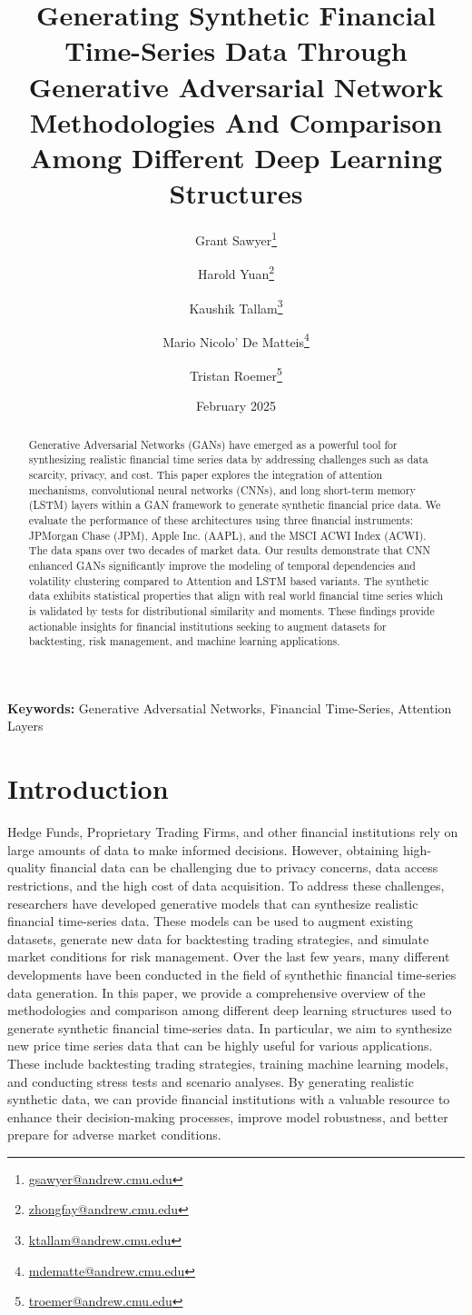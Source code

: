 \documentclass{article}
\title{Generating Synthetic Financial Time-Series Data Through Generative Adversarial Network\\[0.5em] \large Methodologies And Comparison Among Different Deep Learning Structures}
\author[1]{Grant Sawyer\thanks{\href{mailto:gsawyer@andrew.cmu.edu}{gsawyer@andrew.cmu.edu}}}
\author[1]{Harold Yuan\thanks{\href{mailto:zhongfay@andrew.cmu.edu}{zhongfay@andrew.cmu.edu}}}
\author[1]{Kaushik Tallam\thanks{\href{mailto:ktallam@andrew.cmu.edu}{ktallam@andrew.cmu.edu}}}
\author[1]{Mario Nicolo' De Matteis\thanks{\href{mailto:mdematte@andrew.cmu.edu}{mdematte@andrew.cmu.edu}}}
\author[1]{Tristan Roemer\thanks{\href{mailto:troemer@andrew.cmu.edu}{troemer@andrew.cmu.edu}}}
\affil[1]{Carnegie Mellon University, MSCF, New York, USA}
\date{February 2025}
\begin{document}
\maketitle

\begin{abstract}
    Generative Adversarial Networks (GANs) have emerged as a powerful tool for synthesizing realistic financial time series data by addressing challenges such as data scarcity, privacy, and cost. This paper explores the integration of attention mechanisms, convolutional neural networks (CNNs), and long short-term memory (LSTM) layers within a GAN framework to generate synthetic financial price data. We evaluate the performance of these architectures using three financial instruments: JPMorgan Chase (JPM), Apple Inc. (AAPL), and the MSCI ACWI Index (ACWI). The data spans over two decades of market data. Our results demonstrate that CNN enhanced GANs significantly improve the modeling of temporal dependencies and volatility clustering compared to Attention and LSTM based variants. The synthetic data exhibits statistical properties that align with real world financial time series which is validated by tests for distributional similarity and moments. These findings provide actionable insights for financial institutions seeking to augment datasets for backtesting, risk management, and machine learning applications.
\end{abstract}

\doublespacing

\noindent \textbf{Keywords:} Generative Adversatial Networks, Financial Time-Series, Attention Layers

\section{Introduction}

Hedge Funds, Proprietary Trading Firms, and other financial institutions rely on large amounts of data to make informed decisions. However, obtaining high-quality financial data can be challenging due to privacy concerns, data access restrictions, and the high cost of data acquisition. To address these challenges, researchers have developed generative models that can synthesize realistic financial time-series data. These models can be used to augment existing datasets, generate new data for backtesting trading strategies, and simulate market conditions for risk management. Over the last few years, many different developments have been conducted in the field of synthethic financial time-series data generation. In this paper, we provide a comprehensive overview of the methodologies and comparison among different deep learning structures used to generate synthetic financial time-series data. In particular, we aim to synthesize new price time series data that can be highly useful for various applications. These include backtesting trading strategies, training machine learning models, and conducting stress tests and scenario analyses. By generating realistic synthetic data, we can provide financial institutions with a valuable resource to enhance their decision-making processes, improve model robustness, and better prepare for adverse market conditions.
\end{document}
